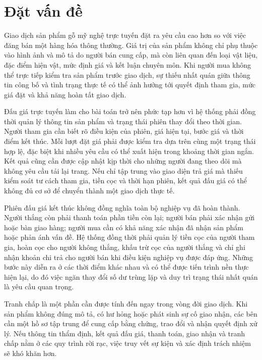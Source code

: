 \documentclass[../DoAn.tex]{subfiles}
\begin{document}
\section{Đặt vấn đề}
\label{section:1.1}

Giao dịch sản phẩm gỗ mỹ nghệ trực tuyến đặt ra yêu cầu cao hơn so với việc đăng bán một hàng hóa thông thường. Giá trị của sản phẩm không chỉ phụ thuộc vào hình ảnh và mô tả do người bán cung cấp, mà còn liên quan đến loại vật liệu, đặc điểm hiện vật, mức định giá và kết luận chuyên môn. Khi người mua không thể trực tiếp kiểm tra sản phẩm trước giao dịch, sự thiếu nhất quán giữa thông tin công bố và tình trạng thực tế có thể ảnh hưởng tới quyết định tham gia, mức giá đặt và khả năng hoàn tất giao dịch.

Đấu giá trực tuyến làm cho bài toán trở nên phức tạp hơn vì hệ thống phải đồng thời quản lý thông tin sản phẩm và trạng thái phiên thay đổi theo thời gian. Người tham gia cần biết rõ điều kiện của phiên, giá hiện tại, bước giá và thời điểm kết thúc. Mỗi lượt đặt giá phải được kiểm tra dựa trên cùng một trạng thái hợp lệ, đặc biệt khi nhiều yêu cầu có thể xuất hiện trong khoảng thời gian ngắn. Kết quả cũng cần được cập nhật kịp thời cho những người đang theo dõi mà không yêu cầu tải lại trang. Nếu chỉ tập trung vào giao diện trả giá mà thiếu kiểm soát tư cách tham gia, tiền cọc và thời hạn phiên, kết quả đấu giá có thể không đủ cơ sở để chuyển thành một giao dịch thực tế.

Phiên đấu giá kết thúc không đồng nghĩa toàn bộ nghiệp vụ đã hoàn thành. Người thắng còn phải thanh toán phần tiền còn lại; người bán phải xác nhận gửi hoặc bàn giao hàng; người mua cần có khả năng xác nhận đã nhận sản phẩm hoặc phản ánh vấn đề. Hệ thống đồng thời phải quản lý tiền cọc của người tham gia, hoàn cọc cho người không thắng, khấu trừ cọc của người thắng và chỉ ghi nhận khoản chi trả cho người bán khi điều kiện nghiệp vụ được đáp ứng. Những bước này diễn ra ở các thời điểm khác nhau và có thể được tiến trình nền thực hiện lại, do đó việc ngăn thay đổi số dư trùng lặp và duy trì trạng thái nhất quán là yêu cầu quan trọng.

Tranh chấp là một phần cần được tính đến ngay trong vòng đời giao dịch. Khi sản phẩm không đúng mô tả, có hư hỏng hoặc phát sinh sự cố giao nhận, các bên cần một hồ sơ tập trung để cung cấp bằng chứng, trao đổi và nhận quyết định xử lý. Nếu thông tin thẩm định, kết quả đấu giá, thanh toán, giao nhận và tranh chấp nằm ở các quy trình rời rạc, việc truy vết sự kiện và xác định trách nhiệm sẽ khó khăn hơn.
\end{document}
